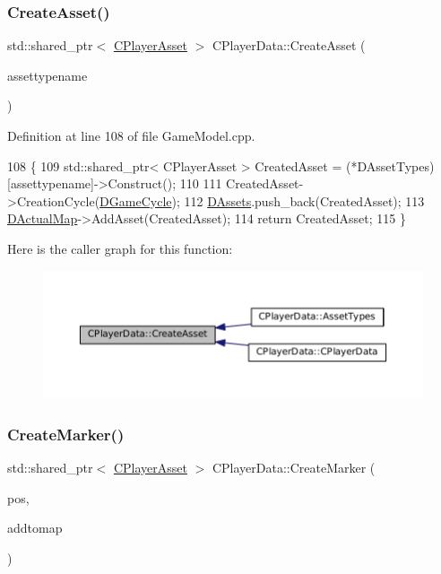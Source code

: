 \subsubsection{\texorpdfstring{Create\+Asset()}{CreateAsset()}}
{\footnotesize\ttfamily std\+::shared\+\_\+ptr$<$ \hyperlink{classCPlayerAsset}{C\+Player\+Asset} $>$ C\+Player\+Data\+::\+Create\+Asset (\begin{DoxyParamCaption}\item[{const std\+::string \&}]{assettypename }\end{DoxyParamCaption})}



Definition at line 108 of file Game\+Model.\+cpp.


\begin{DoxyCode}
108                                                                                     \{
109     std::shared\_ptr< CPlayerAsset > CreatedAsset = (*DAssetTypes)[assettypename]->Construct();
110     
111     CreatedAsset->CreationCycle(\hyperlink{classCPlayerData_ae92ca06a63a01681dd9f3ddc17c0e106}{DGameCycle});
112     \hyperlink{classCPlayerData_a1d7dd355facf52db6242e3554373906c}{DAssets}.push\_back(CreatedAsset);
113     \hyperlink{classCPlayerData_a943801106af1d7ad52abd73d32552186}{DActualMap}->AddAsset(CreatedAsset);
114     \textcolor{keywordflow}{return} CreatedAsset;
115 \}
\end{DoxyCode}
Here is the caller graph for this function\+:\nopagebreak
\begin{figure}[H]
\begin{center}
\leavevmode
\includegraphics[width=350pt]{classCPlayerData_a4d203da2adbd6d00b0cd5b334bddba4f_icgraph}
\end{center}
\end{figure}
\hypertarget{classCPlayerData_a4ef7c98c3b0f28354a2bccc2782b57ad}{}\label{classCPlayerData_a4ef7c98c3b0f28354a2bccc2782b57ad} 
\subsubsection{\texorpdfstring{Create\+Marker()}{CreateMarker()}}
{\footnotesize\ttfamily std\+::shared\+\_\+ptr$<$ \hyperlink{classCPlayerAsset}{C\+Player\+Asset} $>$ C\+Player\+Data\+::\+Create\+Marker (\begin{DoxyParamCaption}\item[{const \hyperlink{classCPosition}{C\+Position} \&}]{pos,  }\item[{bool}]{addtomap }\end{DoxyParamCaption})}




